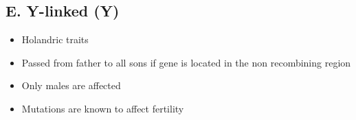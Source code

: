 \documentclass{article}
\begin{document}
\subsection*{E. Y-linked (Y)}
\begin{itemize}
    \item Holandric traits
    \item Passed from father to all sons if gene is located in the non recombining region
    \item Only males are affected
    \item Mutations are known to affect fertility
\end{itemize}
\end{document}
